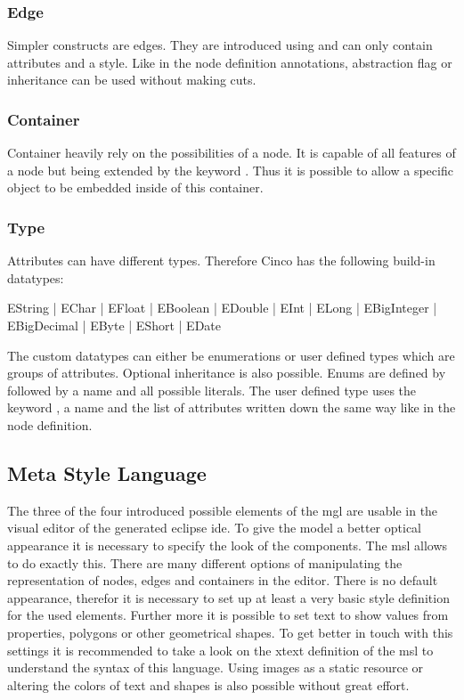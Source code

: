 \subsubsection{Edge}
Simpler constructs are edges. They are introduced using  and can only contain attributes and a style. Like in the node definition annotations, abstraction flag or inheritance can be used without making cuts.

\subsubsection{Container}
Container heavily rely on the possibilities of a node. It is capable of all features of a node but being extended by the keyword . Thus it is possible to allow a specific object to be embedded inside of this container.

\subsubsection{Type}
Attributes can have different types. Therefore Cinco has the following build-in datatypes:

\begin{center}
	EString | EChar | EFloat | EBoolean | EDouble | EInt | ELong | EBigInteger | EBigDecimal | EByte | EShort | EDate
\end{center}


The custom datatypes can either be enumerations or user defined types which are groups of attributes. Optional inheritance is also possible. Enums are defined by  followed by a name and all possible literals. The user defined type uses the keyword , a name and the list of attributes written down the same way like in the node definition.

\subsection{Meta Style Language}

The three of the four introduced possible elements of the \gls{mgl} are usable in the visual editor of the generated eclipse \gls{ide}. To give the model a better optical appearance it is necessary to specify the look of the components. The \gls{msl} allows to do exactly this. There are many different options of manipulating the representation of nodes, edges and containers in the editor. There is no default appearance, therefor it is necessary to set up at least a very basic style definition for the used elements. Further more it is possible to set text to show values from properties, polygons or other geometrical shapes. To get better in touch with this settings it is recommended to take a look on the xtext definition of the \gls{msl} to understand the syntax of this language. Using images as a static resource or altering the colors of text and shapes is also possible without great effort.